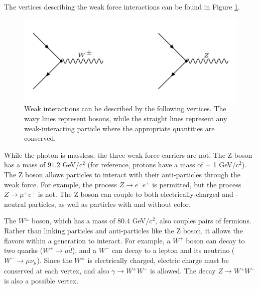 The vertices describing the weak force interactions can be found in Figure \ref{Fig:Intro:Vertex3}.
\begin{figure}[h]
    \centering
        \includegraphics[width=\textwidth]{F1/Vertex3}
        \caption{Weak interactions can be described by the following vertices. The wavy lines represent bosons, while the straight lines represent any weak-interacting particle where the appropriate quantities are conserved.}
        \label{Fig:Intro:Vertex3}
\end{figure}
While the photon is massless, the three weak force carriers are not. The Z boson has a mass of $91.2$ GeV/c$^2$ (for reference, protons have a mass of $\sim$ 1 GeV/c$^2$). The Z boson allows particles to interact with their anti-particles through the weak force. For example, the process $Z\rightarrow e^-e^+$ is permitted, but the process $Z\rightarrow\mu^+e^-$ is not. The Z boson can couple to both electrically-charged and -neutral particles, as well as particles with and without color.

The $W^\pm$ boson, which has a mass of $80.4$ GeV/c$^2$, also couples pairs of fermions. Rather than linking particles and anti-particles like the Z boson, it allows the flavors within a generation to interact. For example, a $W^{+}$ boson can decay to two quarks ($W^{+}\rightarrow u\overline{d}$), and a $W^{-}$ can decay to a lepton and its neutrino ($W^{-}\rightarrow\mu\nu_\mu$). Since the $W^{\pm}$ is electrically charged, electric charge must be conserved at each vertex, and also $\gamma\rightarrow W^+W^-$ is allowed. The decay $Z\rightarrow W^+W^-$ is also a possible vertex.


